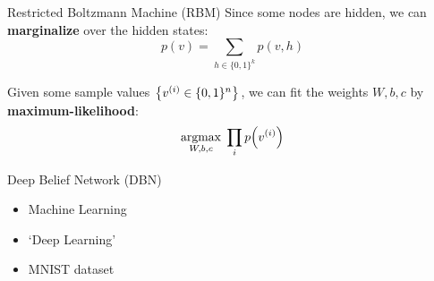 \documentclass[mathserif,xcolor=dvipsnames]{beamer}
\DeclareMathOperator*{\argmax}{arg max}
\begin{document}
\begin{frame}{Restricted Boltzmann Machine (RBM)}
    Since some nodes are hidden, we can \textbf{marginalize} over the hidden
    states:
    \[
        p(v) = \sum_{h \in \{0,1\}^k} p(v, h)
    \]

    \pause

    Given some sample values $\cdil*{v^{(i)} \in \{0,1\}^n}$, we can fit the
    weights $W, b, c$ by \textbf{maximum-likelihood}:
    \[
        \argmax_{W, b, c}\; \prod_{i} p\pdil*{v^{(i)}}
    \]
\end{frame}

\begin{frame}{Deep Belief Network (DBN)}
    \begin{itemize}
    \item Machine Learning
    \item `Deep Learning'
    \item MNIST dataset\\
    \begin{center}
    \end{center}
    \end{itemize}
\end{frame}
\end{document}

